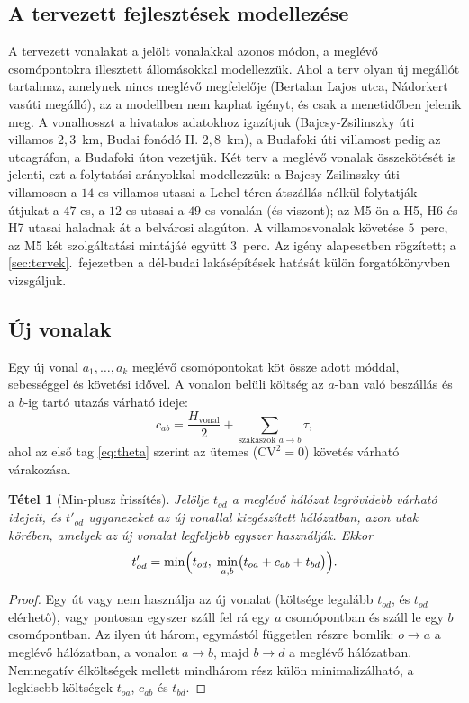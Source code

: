 \documentclass[12pt,a4paper]{article}
\newtheorem{tetel}{Tétel}[section]
\theoremstyle{definition}
\theoremstyle{remark}
\begin{document}
\subsection{A tervezett fejlesztések modellezése}

A tervezett vonalakat a jelölt vonalakkal azonos módon, a meglévő
csomópontokra illesztett állomásokkal modellezzük. Ahol a terv olyan új
megállót tartalmaz, amelynek nincs meglévő megfelelője (Bertalan Lajos utca,
Nádorkert vasúti megálló), az a modellben nem kaphat igényt, és csak a
menetidőben jelenik meg. A vonalhosszt a hivatalos adatokhoz igazítjuk
(Bajcsy-Zsilinszky úti villamos $2{,}3$~km, Budai fonódó II. $2{,}8$~km),
a Budafoki úti villamost pedig az utcagráfon, a Budafoki úton vezetjük.
Két terv a meglévő vonalak összekötését is jelenti, ezt a folytatási
arányokkal modellezzük: a Bajcsy-Zsilinszky úti villamoson a $14$-es villamos
utasai a Lehel téren átszállás nélkül folytatják útjukat a $47$-es, a $12$-es
utasai a $49$-es vonalán (és viszont); az M5-ön a H5, H6 és H7 utasai haladnak
át a belvárosi alagúton. A villamosvonalak követése $5$~perc, az M5 két
szolgáltatási mintájáé együtt $3$~perc. Az igény alapesetben rögzített; a
\ref{sec:tervek}.~fejezetben a dél-budai lakásépítések hatását külön
forgatókönyvben vizsgáljuk.

\subsection{Új vonalak}

Egy új vonal $a_1,\dots,a_k$ meglévő csomópontokat köt össze adott móddal,
sebességgel és követési idővel. A vonalon belüli költség az $a$-ban való
beszállás és a $b$-ig tartó utazás várható ideje:
\[
  c_{ab}=\frac{H_{\mathrm{vonal}}}{2}+\sum_{\text{szakaszok } a\to b}\tau ,
\]
ahol az első tag \eqref{eq:theta} szerint az ütemes ($\mathrm{CV}^2=0$)
követés várható várakozása.

\begin{tetel}[Min-plusz frissítés]
\label{tet:minplus}
Jelölje $t_{od}$ a meglévő hálózat legrövidebb várható idejeit, és
$t'_{od}$ ugyanezeket az új vonallal kiegészített hálózatban, azon utak
körében, amelyek az új vonalat legfeljebb egyszer használják. Ekkor
\begin{equation}
  t'_{od}=\min\Bigl(t_{od},\;\min_{a,b}\bigl(t_{oa}+c_{ab}+t_{bd}\bigr)\Bigr).
  \label{eq:minplus}
\end{equation}
\end{tetel}

\begin{proof}
Egy út vagy nem használja az új vonalat (költsége legalább $t_{od}$, és
$t_{od}$ elérhető), vagy pontosan egyszer száll fel rá egy $a$
csomópontban és száll le egy $b$ csomópontban. Az ilyen út három, egymástól
független részre bomlik: $o\to a$ a meglévő hálózatban, a vonalon
$a\to b$, majd $b\to d$ a meglévő hálózatban. Nemnegatív élköltségek mellett
mindhárom rész külön minimalizálható, a legkisebb költségek $t_{oa}$, $c_{ab}$
és $t_{bd}$.
\end{proof}
\end{document}
